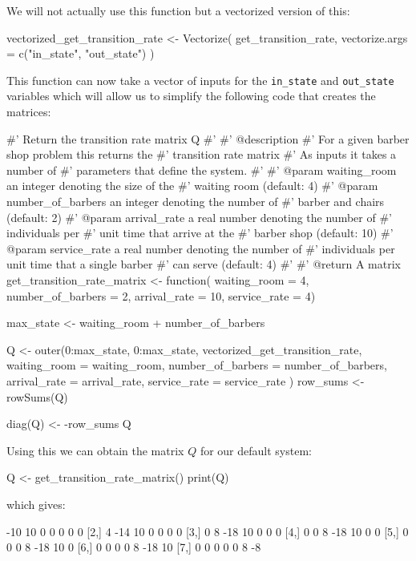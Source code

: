 We will not actually use this function but a vectorized version of this:

\begin{Rin}
vectorized_get_transition_rate <- Vectorize(
  get_transition_rate,
  vectorize.args = c("in_state", "out_state")
)
\end{Rin}

This function can now take a vector of inputs for the \texttt{in_state}
and \texttt{out_state} variables which will allow us to simplify the
following code that creates the matrices:

\begin{Rin}
#' Return the transition rate matrix Q
#'
#' @description
#' For a given barber shop problem this returns the
#' transition rate matrix
#' As inputs it takes a number of
#' parameters that define the system.
#'
#' @param waiting_room an integer denoting the size of the
#'        waiting room (default: 4)
#' @param number_of_barbers an integer denoting the number of
#'        barber and chairs (default: 2)
#' @param arrival_rate a real number denoting the number of
#'        individuals per #' unit time that arrive at the
#'        barber shop (default: 10)
#' @param service_rate a real number denoting the number of
#'        individuals per unit time that a single barber
#'        can serve (default: 4)
#'
#' @return A matrix
get_transition_rate_matrix <- function(
                                       waiting_room = 4,
                                       number_of_barbers = 2,
                                       arrival_rate = 10,
                                       service_rate = 4) {
  max_state <- waiting_room + number_of_barbers

  Q <- outer(0:max_state,
    0:max_state,
    vectorized_get_transition_rate,
    waiting_room = waiting_room,
    number_of_barbers = number_of_barbers,
    arrival_rate = arrival_rate,
    service_rate = service_rate
  )
  row_sums <- rowSums(Q)

  diag(Q) <- -row_sums
  Q
}
\end{Rin}

Using this we can obtain the matrix \(Q\) for our default system:

\begin{Rin}
Q <- get_transition_rate_matrix()
print(Q)
\end{Rin}

which gives:

\begin{Rout}
     [,1] [,2] [,3] [,4] [,5] [,6] [,7]
[1,]  -10   10    0    0    0    0    0
[2,]    4  -14   10    0    0    0    0
[3,]    0    8  -18   10    0    0    0
[4,]    0    0    8  -18   10    0    0
[5,]    0    0    0    8  -18   10    0
[6,]    0    0    0    0    8  -18   10
[7,]    0    0    0    0    0    8   -8
\end{Rout}

